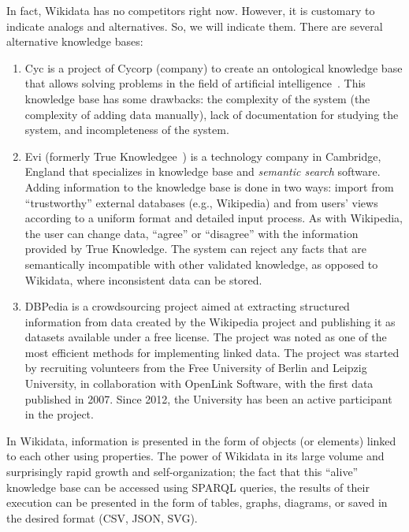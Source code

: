 In fact, Wikidata has no competitors right now. However, it is customary to indicate analogs and alternatives. So, we will indicate them. There are several alternative knowledge bases:
\begin{enumerate}
\item Cyc is a project of Cycorp (company) to create an ontological knowledge base that allows solving problems in the field of artificial intelligence~. This knowledge base has some drawbacks: the complexity of the system (the complexity of adding data manually), lack of documentation for studying the system, and incompleteness of the system. 
\item Evi (formerly True Knowledgee~) is a technology company in Cambridge, England that specializes in knowledge base and \textit{semantic search} 
 software. Adding information to the knowledge base is done in two ways: import from ``trustworthy'' external databases (e.g., Wikipedia) and from users' views according to a uniform format and detailed input process. As with Wikipedia, the user can change
data, ``agree'' or ``disagree'' with the information provided by True Knowledge. The system can reject any facts that are semantically incompatible with other validated knowledge, as opposed to Wikidata, where inconsistent data can be stored.
\item DBPedia is a crowdsourcing project aimed at extracting structured information from data created by the Wikipedia project and publishing it as datasets available under a free license. The project was noted as one of the most efficient methods for implementing linked data.
The project was started by recruiting volunteers from the Free University of Berlin and Leipzig University, in collaboration with OpenLink Software, with the first data published in 2007. Since 2012, the University has been an active participant in the project.
\end{enumerate}
In Wikidata, information is presented in the form of objects (or elements) linked to each other using properties. The power of Wikidata in its large volume and surprisingly rapid growth and self-organization; the fact that this ``alive'' knowledge base can be accessed using SPARQL queries, the results of their execution can be presented in the form of tables, graphs, diagrams, or saved in the desired format (CSV, JSON, SVG).


